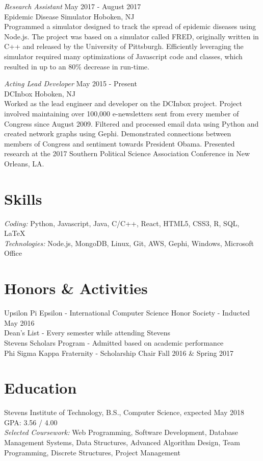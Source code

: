 \documentclass{res}
\begin{document}
{{\sl Research Assistant} \hfill May 2017 - August 2017\\
Epidemic Disease Simulator \hfill Hoboken, NJ \\
Programmed a simulator designed to track the spread of epidemic diseases using Node.js. The project was based on a simulator called FRED, originally  written in C++ and released by the University of Pittsburgh. Efficiently leveraging the simulator required many optimizations of Javascript code and classes, which resulted in up to an 80\% decrease in run-time.

{\sl Acting Lead Developer} \hfill May 2015 - Present \\
DCInbox \hfill Hoboken, NJ \\
Worked as the lead engineer and developer on the DCInbox project. Project involved maintaining over 100,000 e-newsletters sent from every member of Congress since August 2009. Filtered and processed email data using Python and created network graphs using Gephi. Demonstrated connections between members of Congress and sentiment towards President Obama. Presented research at the 2017 Southern Political Science Association Conference in New Orleans, LA.


\section{\bf\large Skills}
{\sl Coding: } Python, Javascript, Java, C/C++, React, HTML5, CSS3, R, SQL, LaTeX \\
{\sl Technologies:} Node.js, MongoDB, Linux, Git, AWS, Gephi, Windows, Microsoft Office

\section{\bf\large Honors \& Activities}
Upsilon Pi Epsilon - International Computer Science Honor Society - Inducted May 2016\\
Dean's List - Every semester while attending Stevens \\
Stevens Scholars Program - Admitted based on academic performance \\ %
Phi Sigma Kappa Fraternity - Scholarship Chair Fall 2016 \& Spring 2017

\section{\bf\large Education}
Stevens Institute of Technology, B.S., Computer Science, expected May 2018 \hfill GPA: 3.56 / 4.00 \\
{\sl Selected Coursework:} Web Programming, Software Development, Database Management Systems, Data Structures, Advanced Algorithm Design, Team Programming, Discrete Structures, Project Management

}
\end{document}
